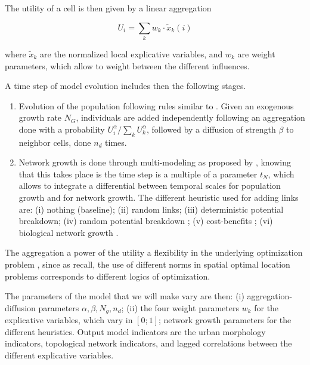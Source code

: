The utility of a cell is then given by a linear aggregation 

\begin{equation}
U_i = \sum_k w_k \cdot \tilde{x}_k(i)
\end{equation}

where $\tilde{x}_k$ are the normalized local explicative variables, and $w_k$ are weight parameters, which allow to weight between the different influences. 


A time step of model evolution includes then the following stages.
\begin{enumerate}
	\item Evolution of the population following rules similar to \cite{2017arXiv170806743R}. Given an exogenous growth rate $N_G$, individuals are added independently following an aggregation done with a probability $U_i^\alpha/\sum_k U_k^\alpha$, followed by a diffusion of strength $\beta$ to neighbor cells, done $n_d$ times.
	\item Network growth is done through multi-modeling as proposed by \cite{raimbault2017modeling} , knowing that this takes place is the time step is a multiple of a parameter $t_N$, which allows to integrate a differential between temporal scales for population growth and for network growth. The different heuristic used for adding links are: (i) nothing (baseline); (ii) random links; (iii) deterministic potential breakdown; (iv) random potential breakdown \citep{schmitt2014modelisation}; (v) cost-benefits \citep{louf2013emergence}; (vi) biological network growth \citep{tero2010rules}.
\end{enumerate}



The  aggregation  a power  of the utility  a flexibility in the underlying optimization problem , since as \cite{josselin2013revisiting} recall, the use of different norms in spatial optimal location problems corresponds to different logics of optimization.



The parameters of the model that we will make vary are then: (i) aggregation-diffusion parameters $\alpha,\beta,N_g,n_d$; (ii) the four weight parameters $w_k$ for the explicative variables, which vary in $[0;1]$; network growth parameters for the different heuristics. Output model indicators are the urban morphology indicators, topological network indicators, and lagged correlations between the different explicative variables.


